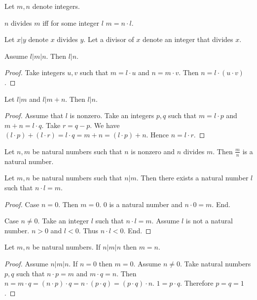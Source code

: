 \documentclass{article}
\begin{document}
\begin{forthel}

Let $m,n$ denote integers.

\begin{definition}
$n$ divides $m$ iff for some integer $l$ $m = n \cdot l$.
\end{definition}

Let $x | y$ denote $x$ divides $y$.
Let a divisor of $x$ denote an integer that divides $x$.

\begin{lemma}
Assume $l | m | n$.
Then $l | n$.
\end{lemma}
\begin{proof}
Take integers $u,v$ such that 
$m = l \cdot u$ and $n = m \cdot v$.
Then $n = l \cdot (u \cdot v)$.
\end{proof}

\begin{lemma}
Let $l | m$ and $l | m + n$.
Then $l | n$.
\end{lemma}
\begin{proof}
Assume that $l$ is nonzero.
Take an integers $p,q$ such that $m = l \cdot p$ and $m + n = l \cdot q$.
Take $r = q - p$.
We have 
$(l \cdot p) + (l \cdot r) = l \cdot q = m + n = (l \cdot p) + n$.
Hence $n = l \cdot r$.
\end{proof}

\begin{lemma}
Let $n,m$ be natural numbers such that $n$ is nonzero and $n$ divides $m$.
Then $\frac{m}{n}$ is a natural number.
\end{lemma}

\begin{lemma}
Let $m,n$ be natural numbers such that $n | m$.
Then there exists a natural number $l$ such that $n \cdot l = m$.
\end{lemma}
\begin{proof}
Case $n = 0$. Then $m = 0$. $0$ is a natural number and $n \cdot 0 = m$. End.

Case $n \neq 0$.
Take an integer $l$ such that $n \cdot l = m$.
Assume $l$ is not a natural number.
$n > 0$ and $l < 0$. Thus $n \cdot l < 0$. End.
\end{proof}

\begin{lemma}
Let $m,n$ be natural numbers.
If $n | m | n$ then $m=n$.
\end{lemma}
\begin{proof}
Assume $n | m | n$.
If $n = 0$ then $m = 0$. Assume $n \neq 0$.
Take natural numbers $p,q$ such that $n \cdot p = m$ and $m \cdot q = n$.
Then $n = m \cdot q = (n \cdot p) \cdot q = n \cdot (p \cdot q) = (p \cdot q) \cdot n$. $1 = p \cdot q$. Therefore $p=q=1$.
\end{proof}


\end{forthel}
\end{document}
